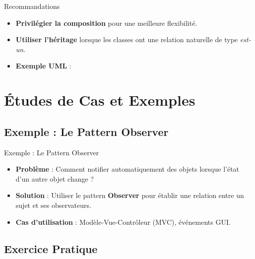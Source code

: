 \documentclass[aspectratio=169]{beamer}
\begin{document}
\begin{frame}{Recommandations}
    \begin{itemize}
        \item \textbf{Privilégier la composition} pour une meilleure flexibilité.
        \item \textbf{Utiliser l'héritage} lorsque les classes ont une relation naturelle de type \textit{est-un}.
        \item \textbf{Exemple UML} :
    \end{itemize}
\end{frame}

\section{Études de Cas et Exemples}

\subsection{Exemple : Le Pattern Observer}

\begin{frame}{Exemple : Le Pattern Observer}
    \begin{itemize}
        \item \textbf{Problème} : Comment notifier automatiquement des objets lorsque l'état d'un autre objet change ?
        \item \textbf{Solution} : Utiliser le pattern \textbf{Observer} pour établir une relation entre un sujet et ses observateurs.
        \item \textbf{Cas d'utilisation} : Modèle-Vue-Contrôleur (MVC), événements GUI.
    \end{itemize}
    \pause
\end{frame}

\subsection{Exercice Pratique}
\end{document}
